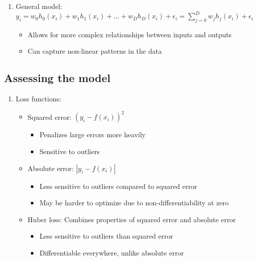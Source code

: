 \documentclass{article}
\begin{document}
\begin{enumerate}
    \item General model: $y_i = w_0h_0(x_i) + w_1h_1(x_i) + \ldots + w_Dh_D(x_i) + \epsilon_i = \sum_{j=0}^D w_jh_j(x_i) + \epsilon_i$
    \begin{itemize}
        \item Allows for more complex relationships between inputs and outputs
        \item Can capture non-linear patterns in the data
    \end{itemize}
\end{enumerate}

\subsection{Assessing the model}
\begin{enumerate}
    \item Loss functions:
    \begin{itemize}
        \item Squared error: $(y_i - f(x_i))^2$
            \begin{itemize}
                \item Penalizes large errors more heavily
                \item Sensitive to outliers
            \end{itemize}
        \item Absolute error: $|y_i - f(x_i)|$
            \begin{itemize}
                \item Less sensitive to outliers compared to squared error
                \item May be harder to optimize due to non-differentiability at zero
            \end{itemize}
        \item Huber loss: Combines properties of squared error and absolute error
            \begin{itemize}
                \item Less sensitive to outliers than squared error
                \item Differentiable everywhere, unlike absolute error
            \end{itemize}
    \end{itemize}
    

\end{enumerate}
\end{document}
